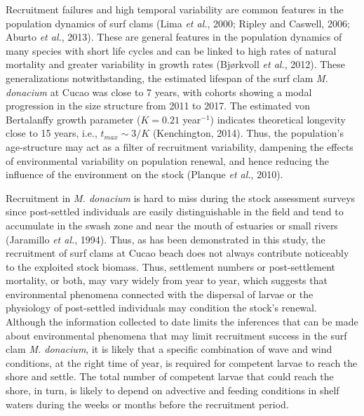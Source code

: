 \documentclass[12pt]{article}
\begin{document}
Recruitment failures and high temporal variability are common features
in the population dynamics of surf clams (Lima \emph{et al.}, 2000;
Ripley and Caswell, 2006; Aburto \emph{et al.}, 2013). These are general
features in the population dynamics of many species with short life
cycles and can be linked to high rates of natural mortality and greater
variability in growth rates (Bjørkvoll \emph{et al.}, 2012). These
generalizations notwithstanding, the estimated lifespan of the surf clam
\emph{M. donacium} at Cucao was close to 7 years, with cohorts showing a
modal progression in the size structure from 2011 to 2017. The estimated
von Bertalanffy growth parameter (\(K=0.21\) year\(^{-1}\)) indicates
theoretical longevity close to 15 years, i.e., \(t_{max} \sim 3/K\)
(Kenchington, 2014). Thus, the population's age-structure may act as a
filter of recruitment variability, dampening the effects of
environmental variability on population renewal, and hence reducing the
influence of the environment on the stock (Planque \emph{et al.}, 2010).

Recruitment in \emph{M. donacium} is hard to miss during the stock
assessment surveys since post-settled individuals are easily
distinguishable in the field and tend to accumulate in the swash zone
and near the mouth of estuaries or small rivers (Jaramillo \emph{et
al.}, 1994). Thus, as has been demonstrated in this study, the
recruitment of surf clams at Cucao beach does not always contribute
noticeably to the exploited stock biomass. Thus, settlement numbers or
post-settlement mortality, or both, may vary widely from year to year,
which suggests that environmental phenomena connected with the dispersal
of larvae or the physiology of post-settled individuals may condition
the stock's renewal. Although the information collected to date limits
the inferences that can be made about environmental phenomena that may
limit recruitment success in the surf clam \emph{M. donacium}, it is
likely that a specific combination of wave and wind conditions, at the
right time of year, is required for competent larvae to reach the shore
and settle. The total number of competent larvae that could reach the
shore, in turn, is likely to depend on advective and feeding conditions
in shelf waters during the weeks or months before the recruitment
period.
\end{document}
